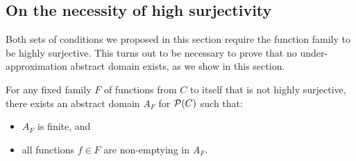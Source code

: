 \subsection{On the necessity of high surjectivity}\label{sec:uai:high-surjective}
\fromhere
Both sets of conditions we proposed in this section require the function family to be highly surjective. This turns out to be necessary to prove that no under-approximation abstract domain exists, as we show in this section.

\begin{prop}\label{prop:uai:existence-base}
	For any fixed family $F$ of functions from $C$ to itself that is not highly surjective, there exists an abstract domain $A_F$ for $\mathcal{P}(C)$ such that:
	\begin{itemize}
		\item $A_F$ is finite, and
		\item all functions $f \in F$ are non-emptying in $A_F$.
	\end{itemize}
\end{prop}

